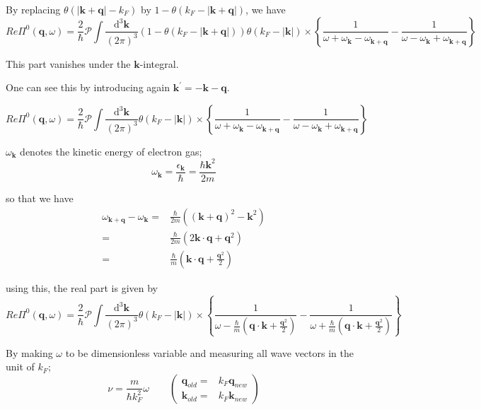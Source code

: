 By replacing $\theta(|\mathbf{k}+\mathbf{q}|-k_F)$ by $1-\theta(k_F - |\mathbf{k}+\mathbf{q}|)$, we have
\[ Re \Pi^0(\mathbf{q},\omega) = \frac{2}{\hbar} \mathscr{P} \int \frac{\mathrm{d}^3 \mathbf{k}}{(2\pi)^3} \left( 1-\theta(k_F-|\mathbf{k}+\mathbf{q}|)\right)\theta(k_F - |\mathbf{k}|) \times \left\{ \frac{1}{\omega+\omega_{\mathbf{k}}- \omega_{\mathbf{k}+\mathbf{q}}} - \frac{1}{\omega-\omega_{\mathbf{k}}+ \omega_{\mathbf{k}+\mathbf{q}}} \right\}
\]

This part vanishes under the $\mathbf{k}$-integral.

One can see this by introducing again $\mathbf{k}^{'}=-\mathbf{k}-\mathbf{q}$.

\[ Re \Pi^0(\mathbf{q},\omega) = \frac{2}{\hbar} \mathscr{P} \int \frac{\mathrm{d}^3 \mathbf{k}}{(2\pi)^3} \theta(k_F - |\mathbf{k}|) \times \left\{ \frac{1}{\omega+\omega_{\mathbf{k}}- \omega_{\mathbf{k}+\mathbf{q}}} - \frac{1}{\omega-\omega_{\mathbf{k}}+ \omega_{\mathbf{k}+\mathbf{q}}} \right\}
\]

$\omega_{\mathbf{k}}$ denotes the kinetic energy of electron gas;
\[ \omega_{\mathbf{k}} = \frac{\epsilon_{\mathbf{k}}}{\hbar} = \frac{\hbar \mathbf{k}^2}{2m} \]

so that we have
\begin{equation} \label{Eqs2.8.17} \begin{split}
\omega_{\mathbf{k}+\mathbf{q}} - \omega_{\mathbf{k}} =& \frac{\hbar}{2m}\left( (\mathbf{k}+\mathbf{q})^2-\mathbf{k}^2 \right)\\
=& \frac{\hbar}{2m}\left( 2 \mathbf{k} \cdot \mathbf{q} + \mathbf{q}^2 \right)\\
=& \frac{\hbar}{m} \left( \mathbf{k}\cdot \mathbf{q} + \frac{\mathbf{q}^2}{2} \right)
\end{split}\end{equation}

using this, the real part is given by
\[ Re \Pi^0(\mathbf{q},\omega) = \frac{2}{\hbar} \mathscr{P} \int \frac{\mathrm{d}^3 \mathbf{k}}{(2\pi)^3} \theta(k_F - |\mathbf{k}|) \times \left\{ \frac{1}{\omega-\frac{\hbar}{m}(\mathbf{q}\cdot\mathbf{k}+\frac{\mathbf{q}^2}{2})} - \frac{1}{\omega+\frac{\hbar}{m}(\mathbf{q}\cdot\mathbf{k}+\frac{\mathbf{q}^2}{2})} \right\}
\]

By making $\omega$ to be dimensionless variable and measuring all wave vectors in the unit of $k_F$;
\begin{equation} \label{Eqs2.8.18}
\nu = \frac{m}{\hbar k_F^2} \omega \qquad
\left( \begin{split} \mathbf{q}_{old} =& k_F \mathbf{q}_{new}\\
\mathbf{k}_{old} =& k_F \mathbf{k}_{new}  \end{split}\right)
\end{equation}

